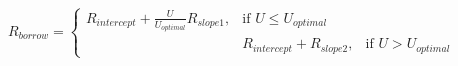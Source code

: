 \documentclass[preview]{standalone}
\begin{document}
\begin{align*}
R _{borrow} = \begin{cases}  R _{intercept} + \frac{U}{U_{optimal}} R _{slope1}, & \text{if } U \leq U_{optimal} \\&  R _{intercept} +  R _{slope2}, & \text{if } U > U_{optimal}  \end{cases}
\end{align*}
\end{document}
